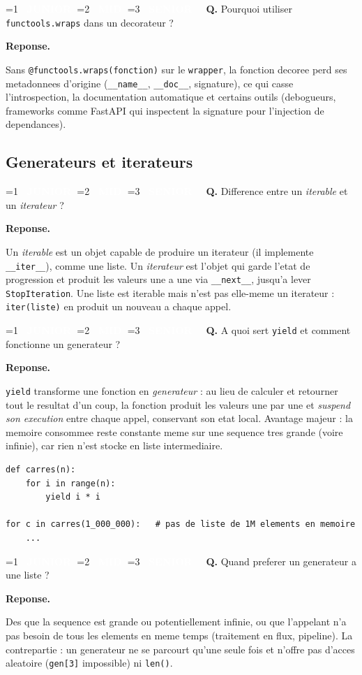 \documentclass[11pt,a4paper]{article}
\newcommand{\badgeJ}{\textcolor{white}{\colorbox{junior}{\small\bfseries\ JUNIOR\ }}}
\newcommand{\badgeM}{\textcolor{white}{\colorbox{mid}{\small\bfseries\ MID\ }}}
\newcommand{\badgeS}{\textcolor{white}{\colorbox{senior}{\small\bfseries\ SENIOR\ }}}
\newcounter{qcount}
\newenvironment{qa}[2]{%
  \stepcounter{qcount}%
  \par\vspace{6pt}%
  \noindent\colorbox{qbg}{\parbox{\dimexpr\linewidth-12pt}{\vspace{2pt}%
  \ifnum#1=1 \badgeJ\fi\ifnum#1=2 \badgeM\fi\ifnum#1=3 \badgeS\fi
  \ \textbf{Q\theqcount.} #2\vspace{2pt}}}\par\vspace{4pt}%
  \noindent\textbf{\color{accent}Reponse.}\ \ignorespaces
}{%
  \par\vspace{8pt}%
}
\begin{document}
\begin{qa}{3}{Pourquoi utiliser \texttt{functools.wraps} dans un decorateur ?}
Sans \texttt{@functools.wraps(fonction)} sur le \texttt{wrapper}, la fonction
decoree perd ses metadonnees d'origine (\texttt{\_\_name\_\_},
\texttt{\_\_doc\_\_}, signature), ce qui casse l'introspection, la
documentation automatique et certains outils (debogueurs, frameworks comme
FastAPI qui inspectent la signature pour l'injection de dependances).
\end{qa}

\subsection{Generateurs et iterateurs}

\begin{qa}{1}{Difference entre un \emph{iterable} et un \emph{iterateur} ?}
Un \emph{iterable} est un objet capable de produire un iterateur (il implemente
\texttt{\_\_iter\_\_}), comme une liste. Un \emph{iterateur} est l'objet qui
garde l'etat de progression et produit les valeurs une a une via
\texttt{\_\_next\_\_}, jusqu'a lever \texttt{StopIteration}. Une liste est
iterable mais n'est pas elle-meme un iterateur : \texttt{iter(liste)} en
produit un nouveau a chaque appel.
\end{qa}

\begin{qa}{2}{A quoi sert \texttt{yield} et comment fonctionne un generateur ?}
\texttt{yield} transforme une fonction en \emph{generateur} : au lieu de
calculer et retourner tout le resultat d'un coup, la fonction produit les
valeurs une par une et \emph{suspend son execution} entre chaque appel,
conservant son etat local. Avantage majeur : la memoire consommee reste
constante meme sur une sequence tres grande (voire infinie), car rien n'est
stocke en liste intermediaire.
\begin{lstlisting}
def carres(n):
    for i in range(n):
        yield i * i

for c in carres(1_000_000):   # pas de liste de 1M elements en memoire
    ...
\end{lstlisting}
\end{qa}

\begin{qa}{2}{Quand preferer un generateur a une liste ?}
Des que la sequence est grande ou potentiellement infinie, ou que l'appelant
n'a pas besoin de tous les elements en meme temps (traitement en flux,
pipeline). La contrepartie : un generateur ne se parcourt qu'une seule fois et
n'offre pas d'acces aleatoire (\texttt{gen[3]} impossible) ni \texttt{len()}.
\end{qa}
\end{document}
